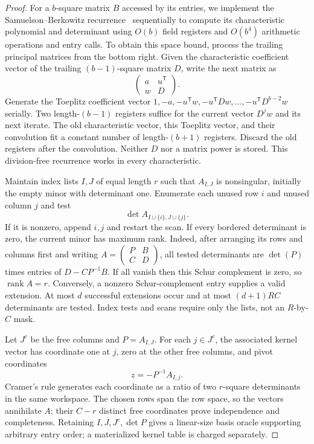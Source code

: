 \documentclass[11pt,letterpaper]{article}
\numberwithin{equation}{section}
\begin{document}
\begin{proof}
For a $b$-square matrix $B$ accessed by its entries, we implement the Samuelson--Berkowitz recurrence~\cite{Berkowitz84} sequentially to compute its characteristic polynomial and determinant using $O(b)$ field registers and $O(b^4)$ arithmetic operations and entry calls.
To obtain this space bound, process the trailing principal matrices from the bottom right.
Given the characteristic coefficient vector of the trailing $(b-1)$-square matrix $D$, write the next matrix as
\[
 \begin{pmatrix}a&u^{\mathsf T}\\w&D\end{pmatrix}.
\]
Generate the Toeplitz coefficient vector $1,-a,-u^{\mathsf T}w,-u^{\mathsf T}Dw,\ldots, -u^{\mathsf T}D^{b-2}w$ serially.
Two length-$(b-1)$ registers suffice for the current vector $D^jw$ and its next iterate.
The old characteristic vector, this Toeplitz vector, and their convolution fit a constant number of length-$(b+1)$ registers.
Discard the old registers after the convolution.
Neither $D$ nor a matrix power is stored.
This division-free recurrence works in every characteristic.

Maintain index lists $I,J$ of equal length $r$ such that $A_{I,J}$ is nonsingular, initially the empty minor with determinant one.
Enumerate each unused row $i$ and unused column $j$ and test
\[
              \det A_{I\cup\{i\},J\cup\{j\}}.
\]
If it is nonzero, append $i,j$ and restart the scan.
If every bordered determinant is zero, the current minor has maximum rank.
Indeed, after arranging its rows and columns first and writing $A=\left(\begin{smallmatrix}P&B\\C&D\end{smallmatrix}\right)$, all tested determinants are $\det(P)$ times entries of $D-CP^{-1}B$.
If all vanish then this Schur complement is zero, so $\operatorname{rank}A=r$.
Conversely, a nonzero Schur-complement entry supplies a valid extension.
At most $d$ successful extensions occur and at most $(d+1)RC$ determinants are tested.
Index tests and scans require only the lists, not an $R$-by-$C$ mask.

Let $J^c$ be the free columns and $P=A_{I,J}$.
For each $j\in J^c$, the associated kernel vector has coordinate one at $j$, zero at the other free columns, and pivot coordinates
\[
                 z=-P^{-1}A_{I,j}.
\]
Cramer's rule generates each coordinate as a ratio of two $r$-square determinants in the same workspace.
The chosen rows span the row space, so the vectors annihilate $A$; their $C-r$ distinct free coordinates prove independence and completeness.
Retaining $I,J,J^c,\det P$ gives a linear-size basis oracle supporting arbitrary entry order; a materialized kernel table is charged separately.


\end{proof}
\end{document}
